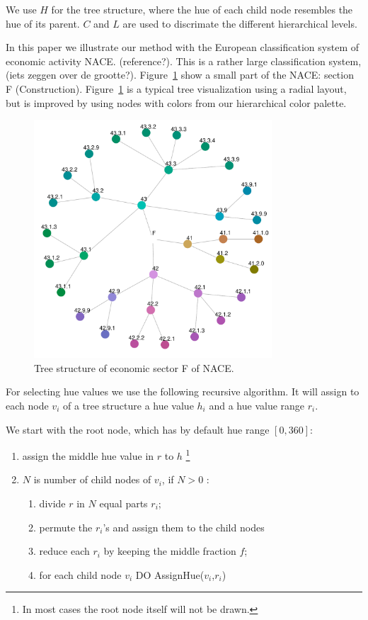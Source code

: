 \documentclass[review]{vgtc}                 %
\begin{document}
We use $H$ for the tree structure, where the hue of each child node resembles the hue of its parent. $C$ and $L$ are used to discrimate the different hierarchical levels.

In this paper we illustrate our method with the European classification system of economic activity NACE. (reference?). This is a rather large classification system, (iets zeggen over de grootte?). Figure~\ref{fig:sbiF} show a small part of the NACE: section F (Construction). Figure~\ref{fig:sbiF} is a typical tree visualization using a radial layout, but is improved by using nodes with colors from our hierarchical color palette. 

\begin{figure}[htb]
  \centering
  \includegraphics[width=3.5in]{sbi_F.pdf}
  \caption{Tree structure of economic sector F of NACE.}\label{fig:sbiF}
\end{figure}

For selecting hue values we use the following recursive algorithm. It will assign to each node $v_i$ of a tree structure a hue value $h_i$ and a hue value range $r_i$.

We start with the root node, which has by default hue range $[0, 360]$:

\begin{enumerate} \itemsep1pt \parskip0pt 
\item assign the middle hue value in $r$ to $h$ \footnote{In most cases the root node itself will not be drawn.}
\item $N$ is number of child nodes of $v_i$, if $N>0$ :
\begin{enumerate}[i] \itemsep1pt \parskip0pt 
\item divide $r$ in $N$ equal parts $r_i$;
\item permute the $r_i$'s and assign them to the child nodes
\item reduce each $r_i$ by keeping the middle fraction $f$;
\item for each child node $v_i$ DO AssignHue($v_i$,$r_i$)
\end{enumerate}
\end{enumerate}
\end{document}

